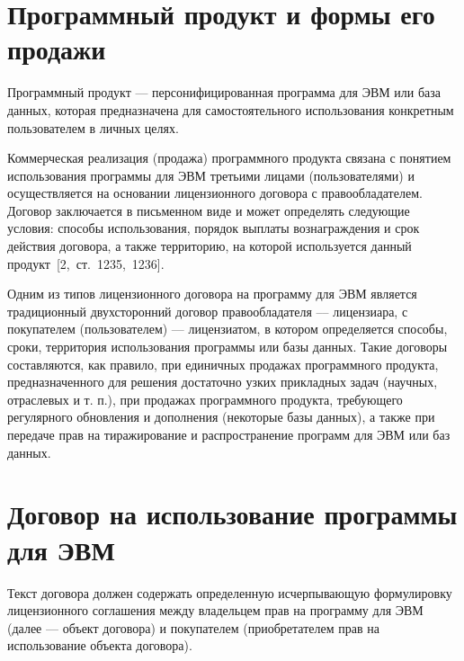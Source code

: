 \section{Программный продукт и формы его продажи}

Программный продукт --- персонифицированная программа для ЭВМ или база данных, которая предназначена
для самостоятельного использования конкретным пользователем в личных целях.

Коммерческая реализация (продажа) программного продукта связана с понятием использования программы для
ЭВМ третьими лицами (пользователями) и осуществляется на основании лицензионного договора с правообладателем.
Договор заключается в письменном виде и может определять следующие условия: способы использования, порядок
выплаты вознаграждения и срок действия договора, а также территорию, на которой используется данный
продукт~[2,~ст.~1235,~1236].

Одним из типов лицензионного договора на программу для ЭВМ является традиционный двухсторонний договор
правообладателя –-- лицензиара, с покупателем (пользователем) --- лицензиатом, в котором определяется
способы, сроки, территория использования программы или базы данных. Такие договоры составляются, как
правило, при единичных продажах программного продукта, предназначенного для решения достаточно узких
прикладных задач (научных, отраслевых и т. п.), при продажах программного продукта, требующего регулярного
обновления и дополнения (некоторые базы данных), а также при передаче прав на тиражирование и
распространение программ для ЭВМ или баз данных.

\section{Договор на использование программы для ЭВМ}

Текст договора должен содержать определенную исчерпывающую формулировку лицензионного соглашения между
владельцем прав на программу для ЭВМ (далее --- объект договора) и покупателем (приобретателем прав
на использование объекта договора).